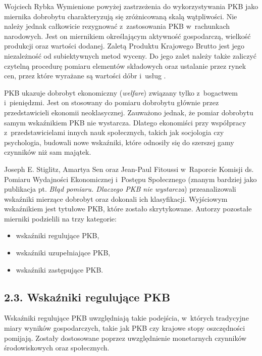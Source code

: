 \begin{artplenv}{Wojciech Rybka}
Wymienione powyżej zastrzeżenia do wykorzystywania PKB jako miernika dobrobytu charakteryzują się zróżnicowaną skalą
wątpliwości. Nie należy jednak całkowicie rezygnować z~zastosowania PKB w~rachunkach narodowych. Jest on miernikiem
określającym aktywność gospodarczą, wielkość produkcji oraz wartości dodanej. Zaletą Produktu Krajowego Brutto jest
jego niezależność od subiektywnych metod wyceny. Do jego zalet należy także zaliczyć czytelną procedurę pomiaru
elementów składowych oraz ustalanie przez rynek cen, przez które wyrażane są wartości dóbr i~usług
\parencite{luszczyk_pomiar_2013}.

PKB ukazuje dobrobyt ekonomiczny (\textit{welfare}) związany tylko z~bogactwem i~pieniędzmi. Jest on stosowany do
pomiaru dobrobytu głównie przez przedstawicieli ekonomii neoklasycznej. Zauważono jednak, że pomiar dobrobytu samym
wskaźnikiem PKB nie wystarcza. Dlatego ekonomiści przy współpracy z~przedstawicielami innych nauk społecznych, takich jak
socjologia czy psychologia, budowali nowe wskaźniki, które odnosiły się do szerszej gamy czynników niż sam majątek. 

Joseph E. Stiglitz, Amartya Sen oraz Jean-Paul Fitoussi w~Raporcie Komisji ds. Pomiaru Wydajności Ekonomicznej i~Postępu
Społecznego
\parencite{stiglitz_blad_2013}
(znanym bardziej jako publikacja pt. \textit{Błąd pomiaru.
Dlaczego PKB nie wystarcza}) przeanalizowali wskaźniki mierzące dobrobyt oraz dokonali ich klasyfikacji. Wyjściowym
wskaźnikiem jest tytułowe PKB, które zostało skrytykowane. Autorzy pozostałe mierniki podzielili na trzy kategorie:

\begin{itemize}
\item wskaźniki regulujące PKB,
\item wskaźniki uzupełniające PKB,
\item wskaźniki zastępujące PKB. 
\end{itemize}

\subsection{2.3. Wskaźniki regulujące PKB}

Wskaźniki regulujące PKB uwzględniają takie podejścia, w~których tradycyjne miary wyników gospodarczych, takie jak PKB
czy krajowe stopy oszczędności pomijają. Zostały dostosowane poprzez uwzględnienie monetarnych czynników środowiskowych
oraz społecznych.


\end{artplenv}
